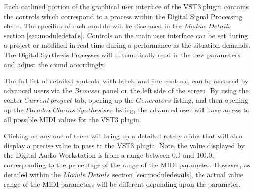 \documentclass[a4paper,12pt]{report}
\begin{document}
\begin{multicols}{2}
Each outlined portion of the graphical user interface of the VST3 plugin contains the controls which correspond to a process within the Digital Signal Processing chain. The specifics of each module will be discussed in the $Module\ Details$ section \ref{sec:moduledetails}. Controls on the main user interface can be set during a project or modified in real-time during a performance as the situation demands. The Digital Synthesis Processes will automatically read in the new parameters and adjust the sound accordingly.

The full list of detailed controls, with labels and fine controls, can be accessed by advanced users via the $Browser$ panel on the left side of the screen. By using the center $Current\ project$ tab, opening up the $Generators$ listing, and then opening up the $Paradox\ Chains\ Synthesiser$ listing, the advanced user will have access to all possible MIDI values for the VST3 plugin.

Clicking on any one of them will bring up a detailed rotary slider that will also display a precise value to pass to the VST3 plugin. Note, the value displayed by the Digital Audio Workstation is from a range between $0.0$ and $100.0$, corresponding to the percentage of the range of the MIDI parameter. However, as detailed within the $Module\ Details$ section \ref{sec:moduledetails}, the actual value range of the MIDI parameters will be different depending upon the parameter.


\end{multicols}
\end{document}
